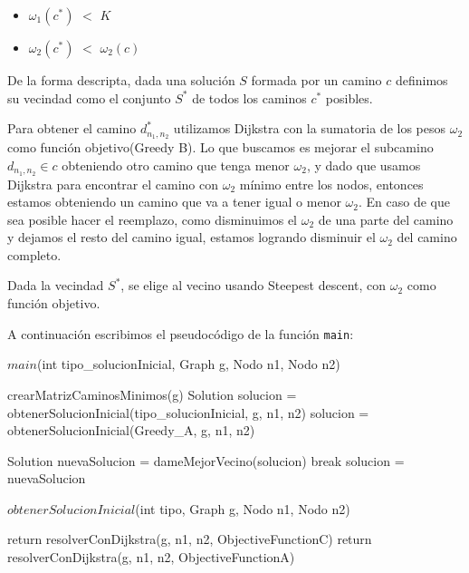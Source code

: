 \begin{itemize}
\item $\omega_1(c^*)$ $<$ $K$
\item $\omega_2(c^*)$ $<$ $\omega_2(c)$
\end{itemize}

De la forma descripta, dada una solución $S$ formada por un camino $c$ definimos su vecindad como el conjunto $S^*$ de todos los caminos $c^*$ posibles.

Para obtener el camino $d_{n_1,n_2}^*$ utilizamos Dijkstra con la sumatoria de los pesos $\omega_2$ como función objetivo(Greedy B). Lo que buscamos es mejorar el subcamino $d_{n_1,n_2} \in c$ obteniendo otro camino que tenga menor $\omega_2$, y dado que usamos Dijkstra para encontrar el camino con $\omega_2$ mínimo entre los nodos, entonces estamos obteniendo un camino que va a tener igual o menor $\omega_2$. En caso de que sea posible hacer el reemplazo, como disminuimos el $\omega_2$ de una parte del camino y dejamos el resto del camino igual, estamos logrando disminuir el $\omega_2$ del camino completo.

Dada la vecindad $S^*$, se elige al vecino usando Steepest descent, con $\omega_2$ como función objetivo.

A continuación escribimos el pseudocódigo de la función \texttt{main}:
\begin{algorithm}[H]
\caption{$main$(int tipo\_solucionInicial, Graph g, Nodo n1, Nodo n2)}
\begin{algorithmic}[1]
  \State crearMatrizCaminosMinimos(g)
  \State Solution solucion = obtenerSolucionInicial(tipo\_solucionInicial, g, n1, n2)
    solucion = obtenerSolucionInicial(Greedy\_A, g, n1, n2)
  \EndIf
  
    	\State Solution nuevaSolucion = dameMejorVecino(solucion)
		\State break	
	\EndIf    
	\State solucion = nuevaSolucion	
    \EndWhile
  \EndIf
\end{algorithmic}
\end{algorithm}

\begin{algorithm}[H]
\caption{$obtenerSolucionInicial$(int tipo, Graph g, Nodo n1, Nodo n2)}
\begin{algorithmic}[1]
	\State return resolverConDijkstra(g, n1, n2, ObjectiveFunctionC)
  \EndIf
  \State return resolverConDijkstra(g, n1, n2, ObjectiveFunctionA)
\end{algorithmic}
\end{algorithm}


